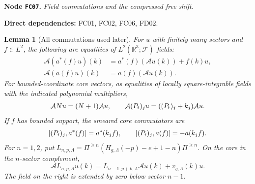 \documentclass[11pt,a4paper]{article}
\newtheorem{lemma}[theorem]{Lemma}
\theoremstyle{remark}\newtheorem{remark}[theorem]{Remark}
\newcommand{\R}{\mathbb R}\newcommand{\C}{\mathbb C}\newcommand{\N}{\mathbb N}
\newcommand{\F}{\mathcal F}\newcommand{\Q}{\mathcal Q}\newcommand{\HH}{\mathcal H}
\newcommand{\node}[3]{\par\Needspace{6\baselineskip}\smallskip\hypertarget{node:#1}{}\label{nodepage:#1}\noindent\textbf{Node \texttt{#1}.} \textit{#2.}\par\noindent\textbf{Direct dependencies:} #3.\par}
\begin{document}
\node{FC07}{Field commutations and the compressed free shift}{FC01, FC02, FC06, FD02}
\begin{lemma}[All commutations used later]\label{lem:fieldCCR}
For $u$ with finitely many sectors and $f\in L^2$, the following are equalities of $L^2(\R^3;\F)$ fields:
\begin{align*}
 \mathcal A(a^*(f)u)(k)&=a^*(f)(\mathcal Au(k))+f(k)u,\\
 \mathcal A(a(f)u)(k)&=a(f)(\mathcal Au(k)).
\end{align*}
For bounded-coordinate core vectors, as equalities of locally square-integrable fields with the indicated polynomial multipliers,
\[
 \mathcal A N u=(N+1)\mathcal Au,\qquad
 \mathcal A(P_{\rm f})_j u=((P_{\rm f})_j+k_j)\mathcal Au.
\]
If $f$ has bounded support, the smeared core commutators are
\[
 [(P_{\rm f})_j,a^*(f)]=a^*(k_jf),\qquad
 [(P_{\rm f})_j,a(f)]=-a(k_jf).
\]
For $n=1,2$, put
$L_{n,p,\Lambda}=\Pi^{\geq n}(H_{g,\Lambda}(-p)-e+1-n)\Pi^{\geq n}$.
On the core in the $n$-sector complement,
\begin{equation}
 \mathcal A L_{n,p,\Lambda}u(k)
 =L_{n-1,p+k,\Lambda}\mathcal Au(k)+v_{g,\Lambda}(k)u.
 \label{eq:projectedcorePT}
\end{equation}
The field on the right is extended by zero below sector $n-1$.
\end{lemma}
\end{document}
